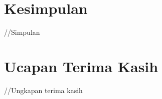 \documentclass[fleqn,10pt]{SelfArx} %
\begin{document}




\section{Kesimpulan}

//Simpulan


\section*{Ucapan Terima Kasih} %


//Ungkapan terima kasih


\nocite{*}




\end{document}
